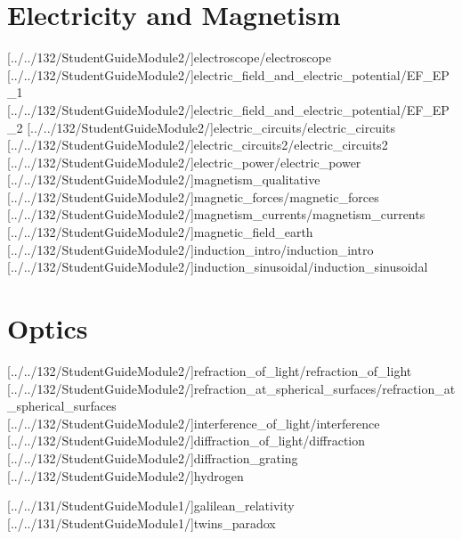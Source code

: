 \documentclass[english,twoside]{labmanual} %
\begin{document}
\part{Electricity and Magnetism}

[../../132/StudentGuideModule2/]{electroscope/electroscope}
[../../132/StudentGuideModule2/]{electric_field_and_electric_potential/EF_EP_1}
[../../132/StudentGuideModule2/]{electric_field_and_electric_potential/EF_EP_2}
[../../132/StudentGuideModule2/]{electric_circuits/electric_circuits}
[../../132/StudentGuideModule2/]{electric_circuits2/electric_circuits2}
[../../132/StudentGuideModule2/]{electric_power/electric_power}
[../../132/StudentGuideModule2/]{magnetism_qualitative}
[../../132/StudentGuideModule2/]{magnetic_forces/magnetic_forces}
[../../132/StudentGuideModule2/]{magnetism_currents/magnetism_currents}
[../../132/StudentGuideModule2/]{magnetic_field_earth}
[../../132/StudentGuideModule2/]{induction_intro/induction_intro}
[../../132/StudentGuideModule2/]{induction_sinusoidal/induction_sinusoidal} %

\part{Optics}

[../../132/StudentGuideModule2/]{refraction_of_light/refraction_of_light} %
[../../132/StudentGuideModule2/]{refraction_at_spherical_surfaces/refraction_at_spherical_surfaces} %
[../../132/StudentGuideModule2/]{interference_of_light/interference} %
[../../132/StudentGuideModule2/]{diffraction_of_light/diffraction} %
[../../132/StudentGuideModule2/]{diffraction_grating} %
[../../132/StudentGuideModule2/]{hydrogen} %


[../../131/StudentGuideModule1/]{galilean_relativity}
[../../131/StudentGuideModule1/]{twins_paradox}
\end{document}
